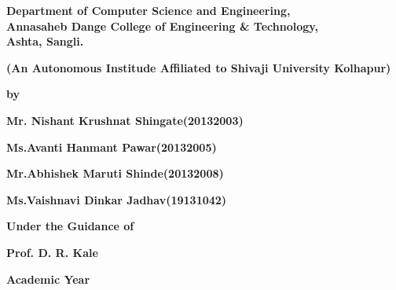 \documentclass[english]{article}
\begin{document}
\vspace{2pt}
\begin{center}
\textbf{\Large Department of Computer Science and Engineering,}\\
\vspace{5pt}
\textbf{ \large Annasaheb Dange College of Engineering \& Technology,}\\
\vspace{8pt}
\textbf{ \large Ashta, Sangli.}
\end{center}{\Large \par}
\begin{center}
\textbf{(An Autonomous Institude Affiliated to Shivaji University Kolhapur)}
\end{center}

\vspace{2pt}

\begin{center}
{\textbf{by}} 
\end{center}

\begin{center}
\hspace{1cm}\textbf{\large   Mr. Nishant Krushnat Shingate(20132003)}
\end{center}
\begin{center}
\hspace{1.5cm}\textbf{\large Ms.Avanti Hanmant Pawar(20132005)}
\end{center}
\begin{center}
\hspace{0.5cm}\textbf{\large Mr.Abhishek Maruti Shinde(20132008)}
\end{center}
\begin{center}
\hspace{1.7cm}\textbf{\large Ms.Vaishnavi Dinkar Jadhav(19131042)}
\end{center}

\vspace{10pt}

\begin{center}
{ \textbf{Under the Guidance of}} 
\end{center}

\begin{center}
\textbf{\Large Prof. D. R. Kale}
\end{center}

\vspace{25pt}
\begin{center}
{\large \textbf{Academic Year}} 
\end{center}
\end{document}
